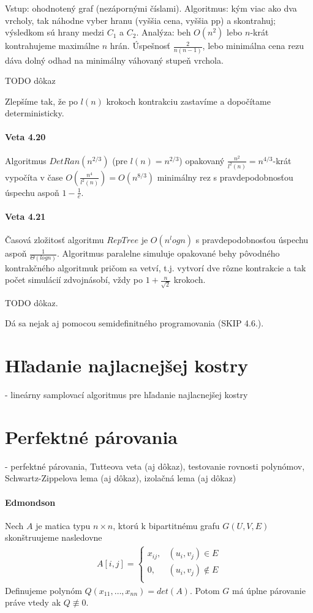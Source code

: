\documentclass[12pt,a4paper]{article}
\begin{document}
Vstup: ohodnotený graf (nezápornými číslami). Algoritmus: kým viac ako dva vrcholy, tak náhodne vyber hranu (vyššia cena, vyššia pp) a skontrahuj; výsledkom sú hrany medzi $C_1$ a $C_2$. Analýza: beh $O(n^2)$ lebo $n$-krát kontrahujeme maximálne $n$ hrán. Úspešnosť $\frac{2}{n(n-1)}$, lebo minimálna cena rezu dáva dolný odhad na minimálny váhovaný stupeň vrchola. 

TODO dôkaz 

Zlepšíme tak, že po $l(n)$ krokoch kontrakciu zastavíme a dopočítame deterministicky. 
\paragraph{Veta 4.20} Algoritmus $DetRan(n^{2/3})$ (pre $l(n) = n^{2/3}$) opakovaný $\frac{n^2}{l^2(n)} = n^{4/3}$-krát vypočíta v čase $O(\frac{n^4}{l^2(n)}) = O(n^{8/3})$ minimálny rez s pravdepodobnosťou úspechu aspoň $1 - \frac{1}{e}$. 

\paragraph{Veta 4.21} Časová zložitosť algoritmu $RepTree$ je $O(n^logn)$ s pravdepodobnosťou úspechu aspoň $\frac{1}{\Theta(log n)}$. Algoritmus paralelne simuluje opakované behy pôvodného kontrakčného algoritmuk pričom sa vetví, t.j. vytvorí dve rôzne kontrakcie a tak počet simulácií zdvojnásobí, vždy po $1 + \frac{n}{\sqrt{2}}$ krokoch.  

TODO dôkaz. 

Dá sa nejak aj pomocou semidefinitného programovania (SKIP 4.6.). 

\section{Hľadanie najlacnejšej kostry}
 - lineárny samplovací algoritmus pre hľadanie najlacnejšej kostry
 

\section{Perfektné párovania}
 - perfektné párovania, Tutteova veta (aj dôkaz), testovanie rovnosti polynómov, Schwartz-Zippelova lema (aj dôkaz), izolačná lema (aj dôkaz)
 
\paragraph{Edmondson} Nech $A$ je matica typu $n \times n$, ktorú k bipartitnému grafu $G(U,V,E)$ skonštruujeme nasledovne
\begin{align*} 
A[i,j] = \left\{ 
  \begin{array}{ll}
    x_{ij}, & (u_i, v_j) \in E \\
    0, & (u_i, v_j) \not\in E \\
  \end{array} 
\right.
\end{align*} 
Definujeme polynóm $Q(x_{11}, \ldots, x_{nn}) = det(A)$. Potom $G$ má úplne párovanie práve vtedy ak $Q \not\equiv 0$. 
\end{document}
